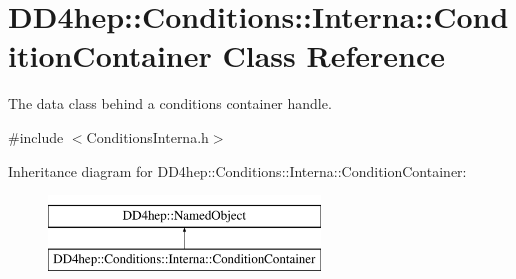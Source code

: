 \hypertarget{class_d_d4hep_1_1_conditions_1_1_interna_1_1_condition_container}{}\section{D\+D4hep\+:\+:Conditions\+:\+:Interna\+:\+:Condition\+Container Class Reference}
\label{class_d_d4hep_1_1_conditions_1_1_interna_1_1_condition_container}


The data class behind a conditions container handle.  




{\ttfamily \#include $<$Conditions\+Interna.\+h$>$}

Inheritance diagram for D\+D4hep\+:\+:Conditions\+:\+:Interna\+:\+:Condition\+Container\+:\begin{figure}[H]
\begin{center}
\leavevmode
\includegraphics[height=2.000000cm]{class_d_d4hep_1_1_conditions_1_1_interna_1_1_condition_container}
\end{center}
\end{figure}
